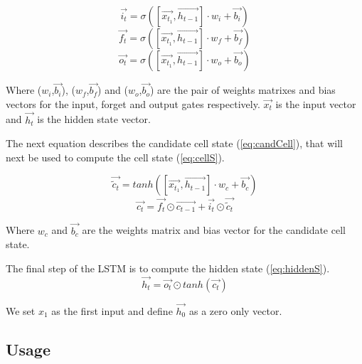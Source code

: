 \begin{equation}\label{eq:inputG}
  \overrightarrow{i_t}=\sigma ([\overrightarrow{x_{t_1}},\overrightarrow{h_{t-1}}]\cdot w_i + \overrightarrow{b_i})
\end{equation}
\begin{equation}\label{eq:forgetG}
  \overrightarrow{f_t}=\sigma ([\overrightarrow{x_{t_1}},\overrightarrow{h_{t-1}}]\cdot w_f + \overrightarrow{b_f})
\end{equation}
\begin{equation}\label{eq:outputG}
  \overrightarrow{o_t}=\sigma ([\overrightarrow{x_{t_1}},\overrightarrow{h_{t-1}}]\cdot w_o + \overrightarrow{b_o})
\end{equation}

Where ($w_i$,$\overrightarrow{b_i}$), ($w_f$,$\overrightarrow{b_f}$) and ($w_o$,$\overrightarrow{b_o}$) are the pair of weights matrixes and bias vectors for the input, forget and output gates respectively. $\overrightarrow{x_t}$ is the input vector and $\overrightarrow{h_t}$ is the hidden state vector.

The next equation describes the candidate cell state (\cref{eq:candCell}), that will next be used to compute the cell state (\cref{eq:cellS}).

\begin{equation}\label{eq:candCell}
  \overrightarrow{\tilde{c}_t}=tanh([\overrightarrow{x_{t_1}},\overrightarrow{h_{t-1}}]\cdot w_c+ \overrightarrow{b_c})
\end{equation}
\begin{equation}\label{eq:cellS}
  \overrightarrow{c_t}=\overrightarrow{f_t}\odot \overrightarrow{c_{t-1}} + \overrightarrow{i_t} \odot \overrightarrow{\tilde{c}_t}
\end{equation}

Where $w_c$ and $\overrightarrow{b_c}$ are the weights matrix and bias vector for the candidate cell state.

The final step of the \ac{LSTM} is to compute the hidden state (\cref{eq:hiddenS}).
\begin{equation}\label{eq:hiddenS}
  \overrightarrow{h_t}=\overrightarrow{o_t}\odot tanh(\overrightarrow{c_t})
\end{equation}

We set $x_1$ as the first input and define $\overrightarrow{h_0}$ as a zero only vector.

\subsection{Usage}

